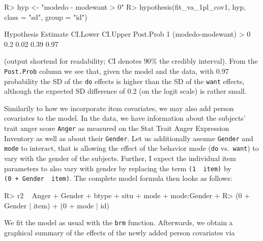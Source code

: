 \documentclass[jss]{jss}
\begin{document}
\begin{CodeChunk}

\begin{CodeInput}
R> hyp <- "modedo - modewant > 0"
R> hypothesis(fit_va_1pl_cov1, hyp, class = "sd", group = "id")
\end{CodeInput}
\end{CodeChunk}

\begin{CodeChunk}

\begin{CodeOutput}
             Hypothesis Estimate CI.Lower CI.Upper Post.Prob
1 (modedo-modewant) > 0      0.2     0.02     0.39      0.97
\end{CodeOutput}
\end{CodeChunk}

(output shortend for readability; CI denotes \(90\%\) the credibly
interval). From the \texttt{Post.Prob} column we see that, given the
model and the data, with 0.97 probability the SD of the \texttt{do}
effects is higher than the SD of the \texttt{want} effects, although the
expected SD difference of 0.2 (on the logit scale) is rather small.

Similarily to how we incorporate item covariates, we may also add person
covariates to the model. In the  data, we have information
about the subjects' trait anger score \texttt{Anger} as measured on the
Stat Trait Anger Expression Inventory \citep[STAXI;][]{spielberger2010}
as well as about their \texttt{Gender}. Let us additionally assume
\texttt{Gender} and \texttt{mode} to interact, that is allowing the
effect of the behavior mode (\texttt{do} vs.~\texttt{want}) to vary with
the gender of the subjects. Further, I expect the individual item
parameters to also vary with gender by replacing the term
\texttt{(1\ \textbar{}\ item)} by
\texttt{(0\ +\ Gender\ \textbar{}\ item)}. The complete model formula
then looks as follows:

\begin{CodeChunk}

\begin{CodeInput}
R> r2 ~ Anger + Gender + btype + situ + mode + mode:Gender +
R>   (0 + Gender | item) + (0 + mode | id)
\end{CodeInput}
\end{CodeChunk}

We fit the model as usual with the \texttt{brm} function. Afterwards, we
obtain a graphical summary of the effects of the newly added person
covariates via
\end{document}
